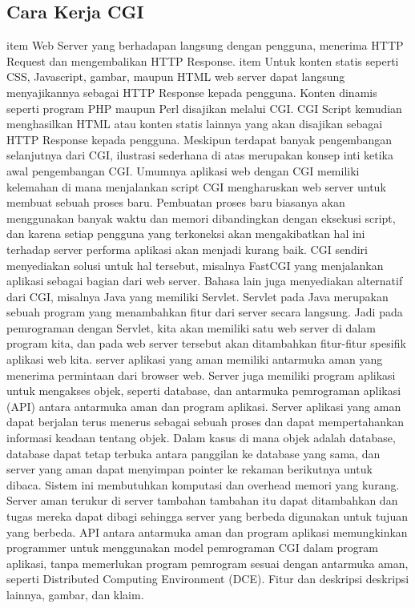 \subsection{Cara Kerja CGI}
item Web Server yang berhadapan langsung dengan pengguna, menerima HTTP Request dan mengembalikan HTTP Response. 
item Untuk konten statis seperti CSS, Javascript, gambar, maupun HTML web server dapat langsung menyajikannya sebagai HTTP Response kepada pengguna. Konten dinamis seperti program PHP maupun Perl disajikan melalui CGI. CGI Script kemudian menghasilkan HTML atau konten statis lainnya yang akan disajikan sebagai HTTP Response kepada pengguna.
Meskipun terdapat banyak pengembangan selanjutnya dari CGI, ilustrasi sederhana di atas merupakan konsep inti ketika awal pengembangan CGI. Umumnya aplikasi web dengan CGI memiliki kelemahan di mana menjalankan script CGI mengharuskan web server untuk membuat sebuah proses baru. Pembuatan proses baru biasanya akan menggunakan banyak waktu dan memori dibandingkan dengan eksekusi script, dan karena setiap pengguna yang terkoneksi akan mengakibatkan hal ini terhadap server performa aplikasi akan menjadi kurang baik. 
CGI sendiri menyediakan solusi untuk hal tersebut, misalnya FastCGI yang menjalankan aplikasi sebagai bagian dari web server. Bahasa lain juga menyediakan alternatif dari CGI, misalnya Java yang memiliki Servlet. Servlet pada Java merupakan sebuah program yang menambahkan fitur dari server secara langsung. Jadi pada pemrograman dengan Servlet, kita akan memiliki satu web server di dalam program kita, dan pada web server tersebut akan ditambahkan fitur-fitur spesifik aplikasi web kita.
server aplikasi yang aman memiliki antarmuka aman yang menerima permintaan dari browser web. Server juga memiliki program aplikasi untuk mengakses objek, seperti database, dan antarmuka pemrograman aplikasi (API) antara antarmuka aman dan program aplikasi. 
Server aplikasi yang aman dapat berjalan terus menerus sebagai sebuah proses dan dapat mempertahankan informasi keadaan tentang objek. Dalam kasus di mana objek adalah database, database dapat tetap terbuka antara panggilan ke database yang sama, dan server yang aman dapat menyimpan pointer ke rekaman berikutnya untuk dibaca.
Sistem ini membutuhkan komputasi dan overhead memori yang kurang. Server aman terukur di server tambahan tambahan itu dapat ditambahkan dan tugas mereka dapat dibagi sehingga server yang berbeda digunakan untuk tujuan yang berbeda. API antara antarmuka aman dan program aplikasi memungkinkan programmer untuk menggunakan model pemrograman CGI dalam program aplikasi, tanpa memerlukan program pemrogram sesuai dengan antarmuka aman, seperti Distributed Computing Environment (DCE). Fitur dan deskripsi deskripsi lainnya, gambar, dan klaim.
